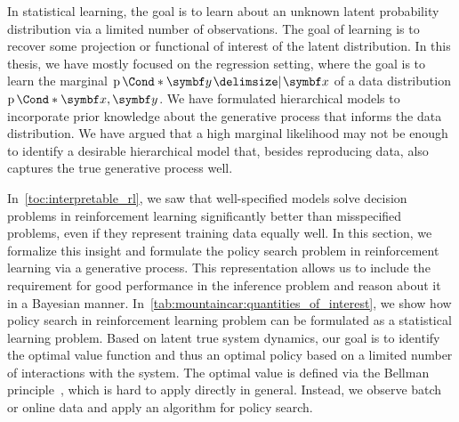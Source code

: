 In statistical learning, the goal is to learn about an unknown latent probability distribution via a limited number of observations.
The goal of learning is to recover some projection or functional of interest of the latent distribution.
In this thesis, we have mostly focused on the regression setting, where the goal is to learn the marginal $\Prob*{\mat{y} \given \mat{x}}$ of a data distribution $\Prob*{\mat{x}, \mat{y}}$.
We have formulated hierarchical models to incorporate prior knowledge about the generative process that informs the data distribution.
We have argued that a high marginal likelihood may not be enough to identify a desirable hierarchical model that, besides reproducing data, also captures the true generative process well.

In~\cref{toc:interpretable_rl}, we saw that well-specified models solve decision problems in reinforcement learning significantly better than misspecified problems, even if they represent training data equally well.
In this section, we formalize this insight and formulate the policy search problem in reinforcement learning via a generative process.
This representation allows us to include the requirement for good performance in the inference problem and reason about it in a Bayesian manner.
In~\cref{tab:mountaincar:quantities_of_interest}, we show how policy search in reinforcement learning problem can be formulated as a statistical learning problem.
Based on latent true system dynamics, our goal is to identify the optimal value function and thus an optimal policy based on a limited number of interactions with the system.
The optimal value is defined via the Bellman principle~\parencite{sutton_reinforcement_2018}, which is hard to apply directly in general.
Instead, we observe batch or online data and apply an algorithm for policy search.

